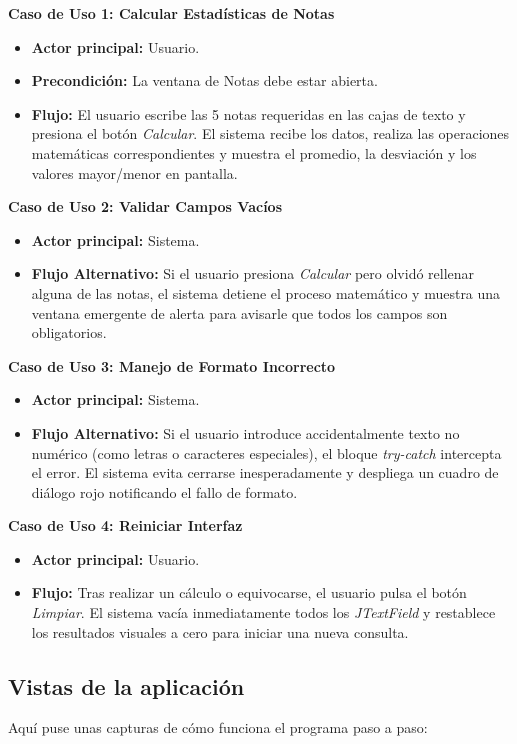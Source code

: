 \documentclass[a4paper,11pt]{article}
\begin{document}
\textbf{Caso de Uso 1: Calcular Estadísticas de Notas}
\begin{itemize}
    \item \textbf{Actor principal:} Usuario.
    \item \textbf{Precondición:} La ventana de Notas debe estar abierta.
    \item \textbf{Flujo:} El usuario escribe las 5 notas requeridas en las cajas de texto y presiona el botón \textit{Calcular}. El sistema recibe los datos, realiza las operaciones matemáticas correspondientes y muestra el promedio, la desviación y los valores mayor/menor en pantalla.
\end{itemize}

\textbf{Caso de Uso 2: Validar Campos Vacíos}
\begin{itemize}
    \item \textbf{Actor principal:} Sistema.
    \item \textbf{Flujo Alternativo:} Si el usuario presiona \textit{Calcular} pero olvidó rellenar alguna de las notas, el sistema detiene el proceso matemático y muestra una ventana emergente de alerta para avisarle que todos los campos son obligatorios.
\end{itemize}

\textbf{Caso de Uso 3: Manejo de Formato Incorrecto}
\begin{itemize}
    \item \textbf{Actor principal:} Sistema.
    \item \textbf{Flujo Alternativo:} Si el usuario introduce accidentalmente texto no numérico (como letras o caracteres especiales), el bloque \textit{try-catch} intercepta el error. El sistema evita cerrarse inesperadamente y despliega un cuadro de diálogo rojo notificando el fallo de formato.
\end{itemize}

\textbf{Caso de Uso 4: Reiniciar Interfaz}
\begin{itemize}
    \item \textbf{Actor principal:} Usuario.
    \item \textbf{Flujo:} Tras realizar un cálculo o equivocarse, el usuario pulsa el botón \textit{Limpiar}. El sistema vacía inmediatamente todos los \textit{JTextField} y restablece los resultados visuales a cero para iniciar una nueva consulta.
\end{itemize}

\subsection{Vistas de la aplicación}
Aquí puse unas capturas de cómo funciona el programa paso a paso:
\end{document}
